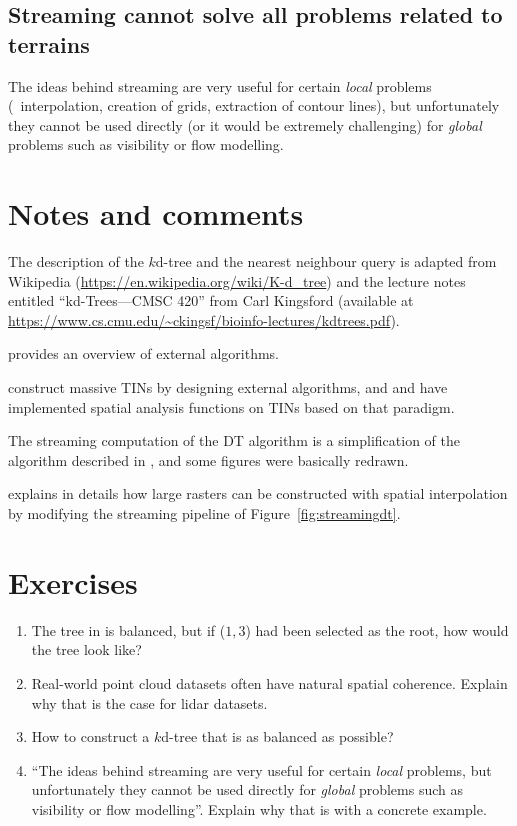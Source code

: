 \subsection{Streaming cannot solve all problems related to terrains}
The ideas behind streaming are very useful for certain \emph{local} problems (\eg\ interpolation, creation of grids, extraction of contour lines), but unfortunately they cannot be used directly (or it would be extremely challenging) for \emph{global} problems such as visibility or flow modelling.

%
\section{Notes and comments}

The description of the $k$d-tree and the nearest neighbour query is adapted from Wikipedia (\url{https://en.wikipedia.org/wiki/K-d_tree}) and the lecture notes entitled ``kd-Trees---CMSC 420'' from Carl Kingsford (available at \url{https://www.cs.cmu.edu/~ckingsf/bioinfo-lectures/kdtrees.pdf}).

\citet{Vitter01} provides an overview of external algorithms.

\citet{Agarwal05} construct massive TINs by designing external algorithms, and \citet{Arge06} and \citet{Agarwal08} have implemented spatial analysis functions on TINs based on that paradigm.

The streaming computation of the DT algorithm is a simplification of the algorithm described in \citet{Isenburg06}, and some figures were basically redrawn.

\citet{Isenburg06-1} explains in details how large rasters can be constructed with spatial interpolation by modifying the streaming pipeline of Figure~\ref{fig:streamingdt}.


%
\section{Exercises}

\begin{enumerate}
  \item The tree in  is balanced, but if ($1,3$) had been selected as the root, how would the tree look like?
  \item Real-world point cloud datasets often have natural spatial coherence. Explain why that is the case for lidar datasets.
  \item How to construct a $k$d-tree that is as balanced as possible?
  \item ``The ideas behind streaming are very useful for certain \emph{local} problems, but unfortunately they cannot be used directly for \emph{global} problems such as visibility or flow modelling''. Explain why that is with a concrete example.
\end{enumerate}
